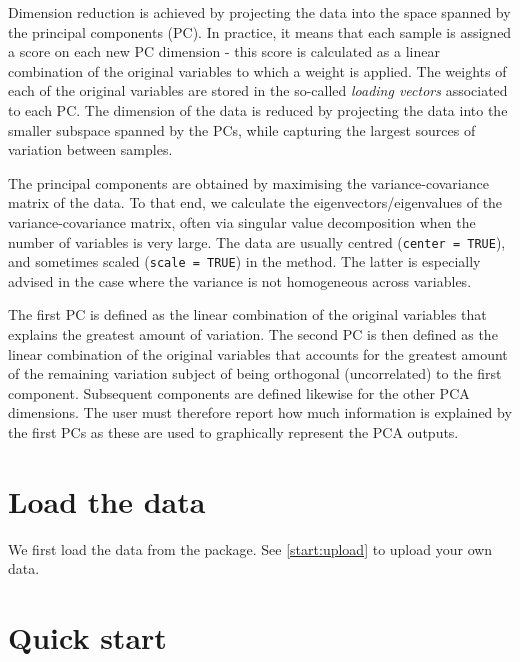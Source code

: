 \documentclass[]{book}
\newenvironment{Shaded}{\begin{snugshade}}{\end{snugshade}}
\newcommand{\KeywordTok}[1]{\textcolor[rgb]{0.13,0.29,0.53}{\textbf{#1}}}
\newcommand{\StringTok}[1]{\textcolor[rgb]{0.31,0.60,0.02}{#1}}
\newcommand{\OperatorTok}[1]{\textcolor[rgb]{0.81,0.36,0.00}{\textbf{#1}}}
\newcommand{\NormalTok}[1]{#1}
\theoremstyle{definition}
\theoremstyle{definition}
\theoremstyle{definition}
\theoremstyle{remark}
\begin{document}
Dimension reduction is achieved by projecting the data into the space
spanned by the principal components (PC). In practice, it means that
each sample is assigned a score on each new PC dimension - this score is
calculated as a linear combination of the original variables to which a
weight is applied. The weights of each of the original variables are
stored in the so-called \emph{loading vectors} associated to each PC.
The dimension of the data is reduced by projecting the data into the
smaller subspace spanned by the PCs, while capturing the largest sources
of variation between samples.

The principal components are obtained by maximising the
variance-covariance matrix of the data. To that end, we calculate the
eigenvectors/eigenvalues of the variance-covariance matrix, often via
singular value decomposition when the number of variables is very large.
The data are usually centred (\texttt{center\ =\ TRUE}), and sometimes
scaled (\texttt{scale\ =\ TRUE}) in the method. The latter is especially
advised in the case where the variance is not homogeneous across
variables.

The first PC is defined as the linear combination of the original
variables that explains the greatest amount of variation. The second PC
is then defined as the linear combination of the original variables that
accounts for the greatest amount of the remaining variation subject of
being orthogonal (uncorrelated) to the first component. Subsequent
components are defined likewise for the other PCA dimensions. The user
must therefore report how much information is explained by the first PCs
as these are used to graphically represent the PCA outputs.

\section{Load the data}\label{load-the-data}

We first load the data from the package. See \ref{start:upload} to
upload your own data.

\begin{Shaded}
\end{Shaded}

\section{Quick start}\label{quick-start}
\end{document}
